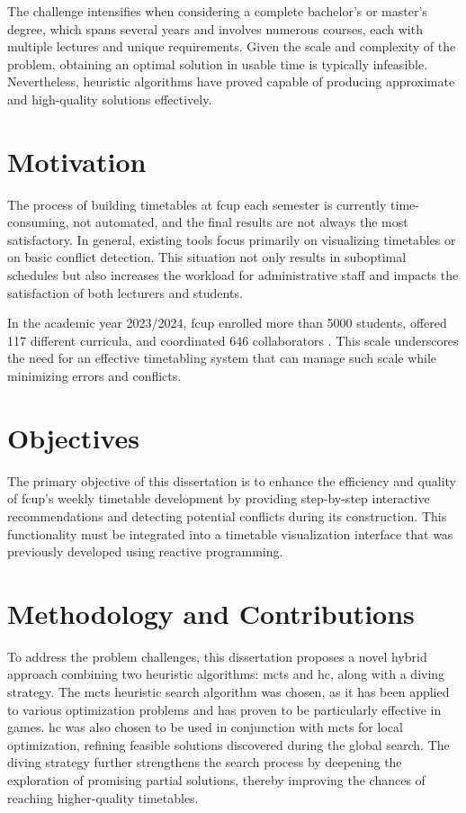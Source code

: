The challenge intensifies when considering a complete bachelor’s or master’s degree, which spans several years and involves numerous courses, each with multiple lectures and unique requirements. Given the scale and complexity of the problem, obtaining an optimal solution in usable time is typically infeasible. Nevertheless, heuristic algorithms have proved capable of producing approximate and high-quality solutions effectively. 

\section{Motivation}

The process of building timetables at \ac{fcup} each semester is currently time-consuming, not automated, and the final results are not always the most satisfactory. In general, existing tools focus primarily on visualizing timetables or on basic conflict detection. This situation not only results in suboptimal schedules but also increases the workload for administrative staff and impacts the satisfaction of both lecturers and students. 

In the academic year 2023/2024, \ac{fcup} enrolled more than 5000 students, offered 117 different curricula, and coordinated 646 collaborators \cite{fcup_em_numeros}. This scale underscores the need for an effective timetabling system that can manage such scale while minimizing errors and conflicts. %

\section{Objectives}

The primary objective of this dissertation is to enhance the efficiency and quality of \ac{fcup}'s weekly timetable development by providing step-by-step interactive recommendations and detecting potential conflicts during its construction. This functionality must be integrated into a timetable visualization interface that was previously developed using reactive programming.

\section{Methodology and Contributions}

To address the problem challenges, this dissertation proposes a novel hybrid approach combining two heuristic algorithms: \ac{mcts} and \ac{hc}, along with a diving strategy. The \ac{mcts} heuristic search algorithm was chosen, as it has been applied to various optimization problems and has proven to be particularly effective in games. \ac{hc} was also chosen to be used in conjunction with \ac{mcts} for local optimization, refining feasible solutions discovered during the global search. The diving strategy further strengthens the search process by deepening the exploration of promising partial solutions, thereby improving the chances of reaching higher-quality timetables.

